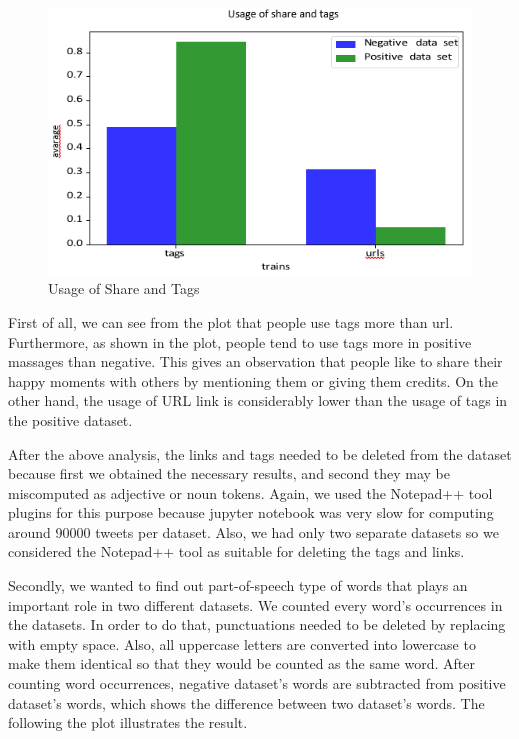 \documentclass[10pt,conference,compsocconf]{IEEEtran}
\begin{document}
\begin{tiny}
	\begin{figure}[b] \label{fig2}
		\includegraphics[scale=0.6]{Lkhamaa1.png}   
		\caption{Usage of Share and Tags }
		\label{fig2}    
	\end{figure}
\end{tiny}

First of all, we can see from the plot that people use tags more than url. Furthermore, as shown in the plot, people tend to use tags more in positive massages than negative. This gives an observation that people like to share their happy moments with others by mentioning them or giving them credits. On the other hand, the usage of URL link is considerably lower than the usage of tags in the positive dataset.

After the above analysis, the links and tags needed to be deleted from the dataset because first we obtained the necessary results, and second they may be miscomputed as adjective or noun tokens. Again, we used the Notepad++ tool plugins for this purpose because jupyter notebook was very slow for computing around 90000 tweets per dataset. Also, we had only two separate datasets so we considered the Notepad++ tool as suitable for deleting the tags and links. 

Secondly, we wanted to find out part-of-speech type of words that plays an important role in two different datasets. We counted every word’s occurrences in the datasets. In order to do that, punctuations needed to be deleted by replacing with empty space. Also, all uppercase letters are converted into lowercase to make them identical so that they would be counted as the same word. After counting word occurrences, negative dataset's words are subtracted from positive dataset's words, which shows the difference between two dataset’s words. The following the plot illustrates the result.
\end{document}
